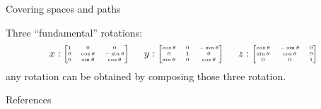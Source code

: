 \documentclass[9pt]{beamer}
\begin{document}
\begin{frame}{Covering spaces and paths}

    Three ``fundamental'' rotations:
    \begin{equation*}
      {\tiny
      x:
      \begin{bmatrix}
          1 & 0 & 0 \\
          0 & \cos\theta & -\sin\theta \\
          0 & \sin\theta & \cos\theta
      \end{bmatrix}\qquad
      y:
      \begin{bmatrix}
          \cos\theta & 0 & -\sin\theta \\
          0 & 1 & 0 \\
          \sin\theta & 0 & \cos\theta
      \end{bmatrix}\qquad
      z:
      \begin{bmatrix}
          \cos\theta & -\sin\theta & 0 \\
          \sin\theta & \cos\theta & 0 \\
          0 & 0 & 1
      \end{bmatrix}}
    \end{equation*}
    any rotation can be obtained by composing those three rotation.
    
\end{frame}


\begin{frame}{References}

    
    

\end{frame}
\end{document}
